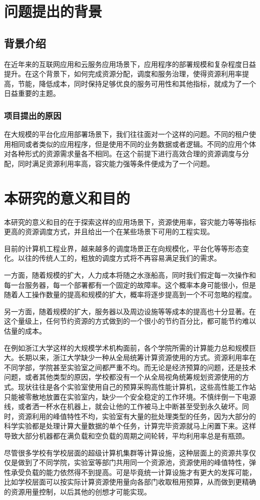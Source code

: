 \section{问题提出的背景}


\subsection{背景介绍}

在近年来的互联网应用和云服务应用场景下，应用程序的部署规模和复杂程度日益提升。在这个背景下，如何完成资源分配，调度和服务治理，使得资源利用率提高，节能，降低成本，同时保持足够优良的服务可用性和其他指标，就成为了一个日益重要的主题。

\subsubsection{项目提出的原因}

在大规模的平台化应用部署场景下，我们往往面对一个这样的问题。不同的租户使用相同或者类似的应用程序，但是使用不同的业务数据或者逻辑。不同的应用个体对各种形式的资源需求量各不相同。在这个前提下进行高效合理的资源调度与分配，同时满足资源利用率高，容灾能力强等条件便成为了一个问题。

\section{本研究的意义和目的}

本研究的意义和目的在于探索这样的应用场景下，资源使用率，容灾能力等等指标更高的资源调度方式，并且给出一个在某些场景下可用的工程实现。

目前的计算机工程业界，越来越多的调度场景正在向规模化，平台化等等形态变化。以往的传统人工的，粗放的调度方式将不再容易满足我们的需求。

一方面，随着规模的扩大，人力成本将随之水涨船高，同时我们假定每一次操作和每一台服务器，每一个部署都有一个固定的故障率。这个概率本身可能很小，但是随着人工操作数量的提高和规模的扩大，概率将逐步提高到一个不可忽略的程度。

另一方面，随着规模的扩大，服务器以及周边设施等等成本的提高也十分显著。在这个量级上，任何节约资源的方式做到的一个很小的节约百分比，都可能节约难以估量的成本。

在例如浙江大学这样的大规模学术机构面前，各个学院所需的计算能力总和规模巨大。长期以来，浙江大学缺少一种从全局统筹计算资源使用的方式。资源利用率在不同学部，学院甚至实验室之间都严重不均。而无论是经济预算的问题，还是技术问题，或者其他类型的原因，学校都没有一个从全局视角统筹规划资源使用的方式。现状往往是各个实验室使用自己的预算采购高性能计算机，这些高性能工作站只能被零散地放置在实验室内，缺少一个安全稳定的工作环境。不慎绊倒一下电源线，或者洒一杯水在机器上，就会让他的工作被马上中断甚至受到永久破坏。同时，资源利用的峰值特性不均，实验室有大量的批处理类型的任务，因为大部分的科学实验都是处理计算大量数据的单个任务，计算完毕资源就马上闲置下来。这样导致大部分机器都在满负载和空负载的周期之间轮转，平均利用率总是有瓶颈。

尽管很多学校有学校层面的超级计算机集群等计算设施，这种层面上的资源共享仅仅是做到了不同学院，实验室等部门共用同一个资源池，资源使用的峰值特性，弹性承受负载的能力依然得不到提高。可是毕竟统一计算设施才有更大的发挥可能，比如学校层面可以按实际计算资源使用量向各部门收取租用预算，从而做到更精确的资源用量控制，以后其他的创想才可能实现。

